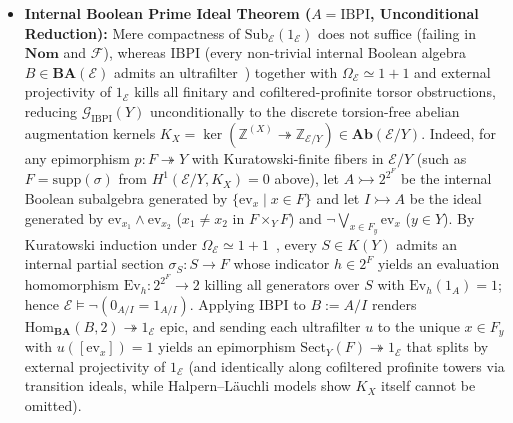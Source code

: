 \documentclass[10pt,twoside,openright]{book}
\theoremstyle{crmplain}
\theoremstyle{crmdef}
\theoremstyle{crmremark}
\begin{document}
\begin{itemize}[leftmargin=1.5em]
  \item \textbf{Internal Boolean Prime Ideal Theorem ($A = \mathrm{IBPI}$, Unconditional Reduction):} Mere compactness of $\mathrm{Sub}_{\mathcal{E}}(1_{\mathcal{E}})$ does not suffice (failing in $\mathbf{Nom}$ and $\mathcal{F}$), whereas $\mathrm{IBPI}$ (every non-trivial internal Boolean algebra $B \in \mathbf{BA}(\mathcal{E})$ admits an ultrafilter~\cite{Deligne72,Johnstone82}) together with $\Omega_{\mathcal{E}} \simeq 1+1$ and external projectivity of $1_{\mathcal{E}}$ kills all finitary and cofiltered-profinite torsor obstructions, reducing $\mathcal{G}_{\mathrm{IBPI}}(Y)$ unconditionally to the discrete torsion-free abelian augmentation kernels $K_X = \ker(\mathbb{Z}^{(X)} \twoheadrightarrow \mathbb{Z}_{\mathcal{E}/Y}) \in \mathbf{Ab}(\mathcal{E}/Y)$. Indeed, for any epimorphism $p : F \twoheadrightarrow Y$ with Kuratowski-finite fibers in $\mathcal{E}/Y$ (such as $F = \mathrm{supp}(\sigma)$ from $H^1(\mathcal{E}/Y, K_X) = 0$ above), let $A \rightarrowtail 2^{2^F}$ be the internal Boolean subalgebra generated by $\{\mathrm{ev}_x \mid x \in F\}$ and let $I \rightarrowtail A$ be the ideal generated by $\mathrm{ev}_{x_1} \wedge \mathrm{ev}_{x_2}$ ($x_1 \neq x_2$ in $F \times_Y F$) and $\neg \bigvee_{x \in F_y} \mathrm{ev}_x$ ($y \in Y$). By Kuratowski induction under $\Omega_{\mathcal{E}} \simeq 1+1$~\cite[\S D5.4]{Johnstone02}, every $S \in K(Y)$ admits an internal partial section $\sigma_S : S \to F$ whose indicator $h \in 2^F$ yields an evaluation homomorphism $\mathrm{Ev}_h : 2^{2^F} \to 2$ killing all generators over $S$ with $\mathrm{Ev}_h(1_A) = 1$; hence $\mathcal{E} \models \neg(0_{A/I} = 1_{A/I})$. Applying $\mathrm{IBPI}$ to $B := A/I$ renders $\mathrm{Hom}_{\mathbf{BA}}(B, 2) \twoheadrightarrow 1_{\mathcal{E}}$ epic, and sending each ultrafilter $u$ to the unique $x \in F_y$ with $u([\mathrm{ev}_x]) = 1$ yields an epimorphism $\mathrm{Sect}_Y(F) \twoheadrightarrow 1_{\mathcal{E}}$ that splits by external projectivity of $1_{\mathcal{E}}$ (and identically along cofiltered profinite towers via transition ideals, while Halpern--L\"auchli models show $K_X$ itself cannot be omitted).


\end{itemize}
\end{document}
